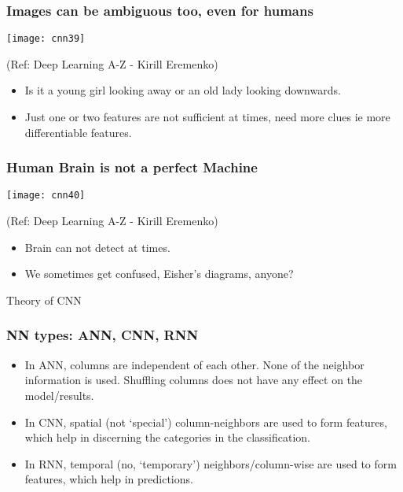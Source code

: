\begin{frame}[fragile] \frametitle{Images can be ambiguous too, even for humans}

\begin{center}
\texttt{[image: cnn39]}

\tiny{(Ref: Deep Learning A-Z - Kirill Eremenko)}
\end{center}

\begin{itemize}
\item Is it a young girl looking away or an old lady looking downwards.
\item Just one or two features are not sufficient at times, need more clues ie more differentiable features.
\end{itemize}

\end{frame}

\begin{frame}[fragile] \frametitle{Human Brain is not a perfect Machine}

\begin{center}
\texttt{[image: cnn40]}

\tiny{(Ref: Deep Learning A-Z - Kirill Eremenko)}
\end{center}

\begin{itemize}
\item Brain can not detect at times.
\item We sometimes get confused, Eisher's diagrams, anyone?
\end{itemize}
\end{frame}



\begin{frame}
  \begin{center}
    {\Large Theory of CNN}
  \end{center}
\end{frame}

\begin{frame}[fragile] \frametitle{NN types: ANN, CNN, RNN}

\begin{itemize}
\item In ANN, columns are independent of each other. None of the neighbor information is used. Shuffling columns does not have any effect on the model/results.
\item In CNN, spatial (not `special') column-neighbors are used to form features, which help in discerning the categories in the classification.
\item In RNN, temporal (no, `temporary') neighbors/column-wise are used to form features, which help in predictions.
\end{itemize}



\end{frame}




